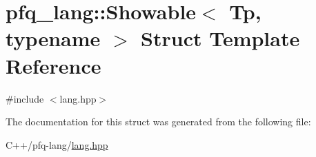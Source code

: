 \hypertarget{structpfq__lang_1_1Showable}{\section{pfq\+\_\+lang\+:\+:Showable$<$ Tp, typename $>$ Struct Template Reference}
\label{structpfq__lang_1_1Showable}
}


{\ttfamily \#include $<$lang.\+hpp$>$}



The documentation for this struct was generated from the following file\+:\begin{DoxyCompactItemize}
\item 
C++/pfq-\/lang/\hyperlink{lang_8hpp}{lang.\+hpp}\end{DoxyCompactItemize}
